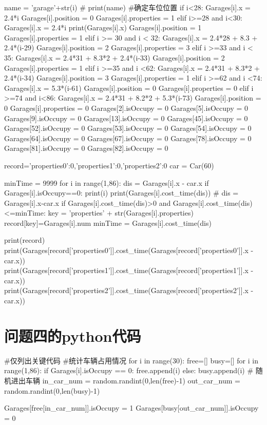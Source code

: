 \documentclass{MathorCupmodeling}
\begin{document}
\begin{python}
		name = 'garage'+str(i)
		# print(name)
		#确定车位位置
		if i<28:
			Garages[i].x = 2.4*i
			Garages[i].position = 0
			Garages[i].properties = 1
		elif i>=28 and i<30:
			Garages[i].x = 2.4*i
			print(Garages[i].x)
			Garages[i].position = 1
			Garages[i].properties = 1
		elif i >= 30 and i < 32:
			Garages[i].x = 2.4*28 + 8.3 + 2.4*(i-29)
			Garages[i].position = 2
			Garages[i].properties = 3
		elif i >=33 and i < 35:
			Garages[i].x = 2.4*31 + 8.3*2 + 2.4*(i-33)
			Garages[i].position = 2
			Garages[i].properties = 1
		elif i >=35 and i <62:
			Garages[i].x = 2.4*31 + 8.3*2 + 2.4*(i-34)
			Garages[i].position = 3
			Garages[i].properties = 1
		elif i >=62 and i <74:
			Garages[i].x = 5.3*(i-61)
			Garages[i].position = 0
			Garages[i].properties = 0
		elif i >=74 and i<86:
			Garages[i].x = 2.4*31 + 8.2*2 + 5.3*(i-73)
			Garages[i].position = 0
			Garages[i].properties = 0
	Garages[2].isOccupy = 0
	Garages[5].isOccupy = 0
	Garages[9].isOccupy = 0
	Garages[13].isOccupy = 0
	Garages[45].isOccupy = 0
	Garages[52].isOccupy = 0
	Garages[53].isOccupy = 0
	Garages[54].isOccupy = 0
	Garages[64].isOccupy = 0
	Garages[67].isOccupy = 0
	Garages[78].isOccupy = 0
	Garages[81].isOccupy = 0
	Garages[82].isOccupy = 0
	
	record={'properties0':0,'properties1':0,'properties2':0}
	car = Car(60)
	
	minTime = 9999
	for i in range(1,86):
		dis = Garages[i].x - car.x
		if Garages[i].isOccupy==0:
			print(i)
			print(Garages[i].cost_time(dis))
			# dis = Garages[i].x-car.x
			if Garages[i].cost_time(dis)>0 and Garages[i].cost_time(dis)<=minTime:
				key = 'properties' + str(Garages[i].properties)
				record[key]=Garages[i].num
				minTime = Garages[i].cost_time(dis)
	
	print(record)
	print(Garages[record['properties0']].cost_time(Garages[record['properties0']].x - car.x))
	print(Garages[record['properties1']].cost_time(Garages[record['properties1']].x - car.x))
	print(Garages[record['properties2']].cost_time(Garages[record['properties2']].x - car.x))
		\end{python}
	\section{问题四的python代码}
	\begin{python}
	#仅列出关键代码
		#统计车辆占用情况
	for i in range(30):
		free=[]
		busy=[]
		for i in range(1,86):
			if Garages[i].isOccupy == 0:
				free.append(i)
			else:
				busy.append(i)
		# 随机进出车辆
		in_car_num = random.randint(0,len(free)-1)
		out_car_num = random.randint(0,len(busy)-1)

		Garages[free[in_car_num]].isOccupy = 1
		Garages[busy[out_car_num]].isOccupy = 0

	
	\end{python}
\end{document}
